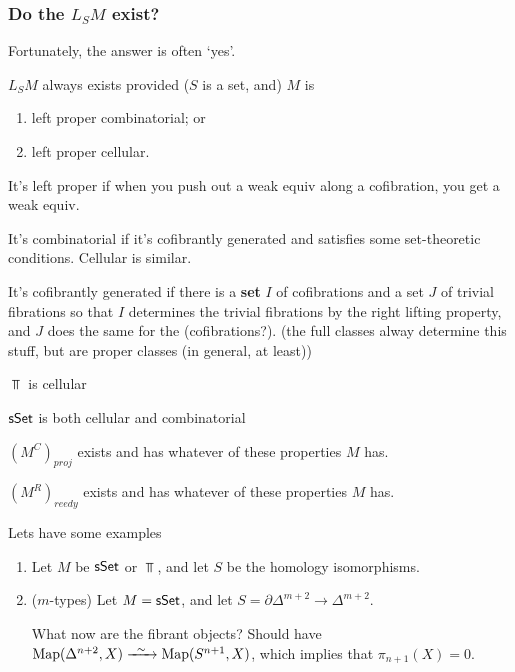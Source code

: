 \documentclass[11pt]{article}
\begin{document}
\begin{AlexandreBausfieldLocalisation}
\begin{PartTwo}
\subsubsection*{Do the $L_SM$ exist?}
Fortunately, the answer is often `yes'.
\begin{thm*}
$L_SM$ always exists provided ($S$ is a set, and) $M$ is
\begin{enumerate}\squishlist
\item left proper combinatorial; or
\item left proper cellular.
\end{enumerate}
\end{thm*}
\begin{defn*}
It's left proper if when you push out a weak equiv along a cofibration, you get a weak equiv.
\end{defn*}
\begin{defn*}
It's combinatorial if it's cofibrantly generated and satisfies some set-theoretic conditions. Cellular is similar.
\end{defn*}
\begin{defn*}
It's cofibrantly generated if there is a \textbf{set} $I$ of cofibrations and a set $J$ of trivial fibrations so that $I$ determines the trivial fibrations by the right lifting property, and $J$ does the same for the (cofibrations?). (the full classes alway determine this stuff, but are proper classes (in general, at least))
\end{defn*}
\begin{exmp*}
\begin{itemise}
\item $\Top$ is cellular
\item $\operatorname{{\mathsf{sSet}}}$ is both cellular and combinatorial
\item $(M^C)_{proj}$ exists and has whatever of these properties $M$ has. 
\item $(M^R)_{reedy}$ exists and has whatever of these properties $M$ has.
\end{itemise}
\end{exmp*}
Lets have some examples
\begin{enumerate}
\item Let $M$ be $\operatorname{{\mathsf{sSet}}}$ or $\Top$, and let $S$ be the homology isomorphisms.
\item ($m$-types) Let $M=\operatorname{{\mathsf{sSet}}}$, and let $S=\partial\Delta^{m+2}\to \Delta^{m+2}$.

What now are the fibrant objects? Should have $\Map(\Delta^{n+2},X)\weakequiv\Map(S^{n+1},X)$, which implies that $\pi_{n+1}(X)=0$.


\end{enumerate}
\end{PartTwo}
\end{AlexandreBausfieldLocalisation}
\end{document}
